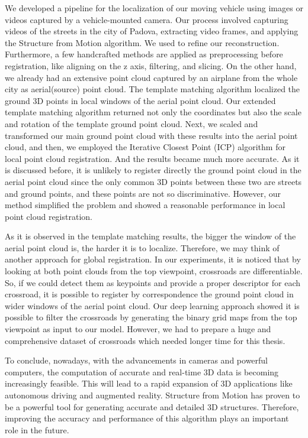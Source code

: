 \documentclass[11pt]{article}
\begin{document}
    We developed a pipeline for the localization of our moving vehicle using images or videos captured by
    a vehicle-mounted camera. Our process involved capturing videos of the streets in the city of Padova, extracting
    video frames, and applying the Structure from Motion algorithm. We used \cite{lindenberger2021pixsfm}
    to refine our reconstruction. Furthermore, a few handcrafted methods are applied as preprocessing before
    registration, like aligning on the z axis, filtering, and slicing. On the other hand, we already had an
    extensive point cloud captured by an airplane from the whole city as aerial(source) point cloud. The template matching algorithm
    localized the ground 3D points in local windows of the aerial point cloud. Our extended template matching
    algorithm returned not only the coordinates but also the scale and rotation of the template ground point cloud.
    Next, we scaled and transformed our main ground point cloud with these results into the aerial point cloud, and then,
    we employed the Iterative Closest Point (ICP) algorithm for local point cloud registration.
    And the results became much more accurate. As it is discussed before, it is unlikely to register directly
    the ground point cloud in the aerial point cloud
    since the only common 3D points between these two are streets and ground points, and these points
    are not so discriminative. However, our method simplified the problem and showed a reasonable performance
    in local point cloud registration.

    As it is observed in the template matching results, the bigger the window of the aerial point cloud is, the harder it is to localize.
    Therefore, we may think of another approach for global registration. In our experiments, it is noticed that by
    looking at both point clouds from the top viewpoint, crossroads are differentiable. So, if we could detect them as
    keypoints and provide a proper descriptor for each crossroad, it is possible to register by correspondence
    the ground point cloud in wider windows of the aerial point cloud. Our deep learning approach showed it is
    possible to filter the crossroads by generating the binary grid maps from the top viewpoint as input to our model.
    However, we had to prepare a huge and comprehensive dataset of crossroads which needed longer time for this thesis.

    To conclude, nowadays, with the advancements in cameras and powerful computers, the computation of accurate and
    real-time 3D data is becoming increasingly feasible. This will lead to a rapid expansion of 3D applications like autonomous
    driving and augmented reality. Structure from Motion has proven to be a powerful tool for generating accurate
    and detailed 3D structures. Therefore, improving the accuracy and performance of this algorithm plays an important role in the future.
\end{document}
